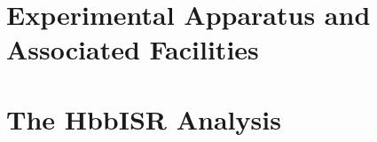 \documentclass[11pt]{ucthesis}
\begin{document}
\begin{spacing}{2.0}



\part{Experimental Apparatus and Associated Facilities}
\label{part:experiment}




\part{The HbbISR Analysis}
\label{part:HbbISR}










\printbibliography

\end{spacing}
\end{document}
